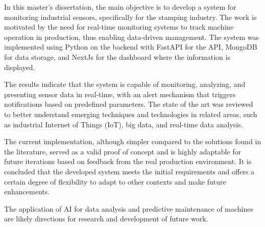
In this master's dissertation, the main objective is to develop a system for monitoring industrial sensors, specifically for the stamping industry. The work is motivated by the need for real-time monitoring systems to track machine operation in production, thus enabling data-driven management. The system was implemented using Python on the backend with FastAPI for the API, MongoDB for data storage, and NextJs for the dashboard where the information is displayed.

The results indicate that the system is capable of monitoring, analyzing, and presenting sensor data in real-time, with an alert mechanism that triggers notifications based on predefined parameters. The state of the art was reviewed to better understand emerging techniques and technologies in related areas, such as industrial Internet of Things (IoT), big data, and real-time data analysis.

The current implementation, although simpler compared to the solutions found in the literature, served as a valid proof of concept and is highly adaptable for future iterations based on feedback from the real production environment. It is concluded that the developed system meets the initial requirements and offers a certain degree of flexibility to adapt to other contexts and make future enhancements.

The application of \gls{AI} for data analysis and predictive maintenance of machines are likely directions for research and development of future work.

\mbox{}\linebreak
{} 


